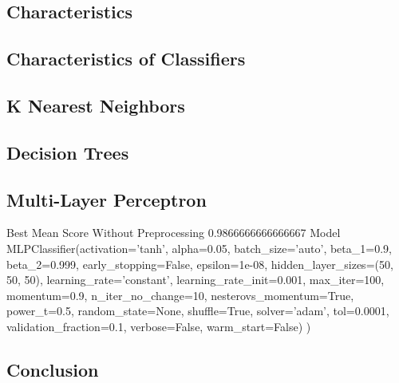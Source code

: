 \subsection{Characteristics}

\subsection{Characteristics of Classifiers}

\subsection{K Nearest Neighbors}

\subsection{Decision Trees}

\subsection{Multi-Layer Perceptron}
Best Mean Score Without Preprocessing 0.9866666666666667 Model MLPClassifier(activation='tanh', alpha=0.05, batch_size='auto', beta_1=0.9,
              beta_2=0.999, early_stopping=False, epsilon=1e-08,
              hidden_layer_sizes=(50, 50, 50), learning_rate='constant',
              learning_rate_init=0.001, max_iter=100, momentum=0.9,
              n_iter_no_change=10, nesterovs_momentum=True, power_t=0.5,
              random_state=None, shuffle=True, solver='adam', tol=0.0001,
              validation_fraction=0.1, verbose=False, warm_start=False)
)

\subsection{Conclusion}